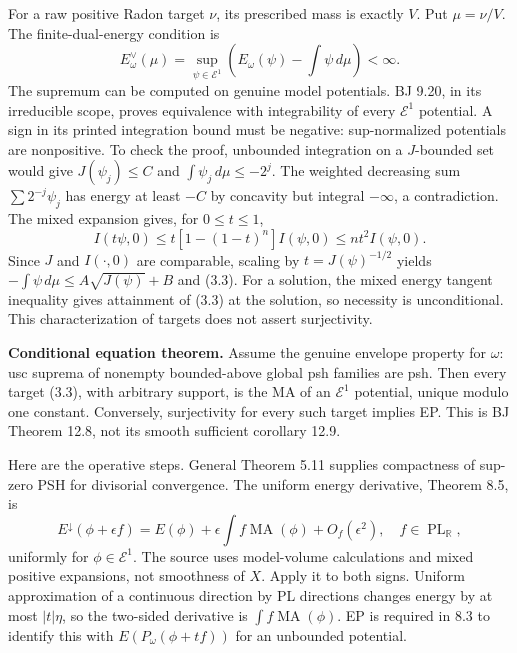 \documentclass[
  10pt,
]{article}
\begin{document}
For a raw positive Radon target \(\nu\), its prescribed mass is exactly
\(V\). Put \(\mu=\nu/V\). The finite-dual-energy condition is
\[E_\omega^\vee(\mu)=\sup_{\psi\in\mathcal E^1}
       \left(E_\omega(\psi)-\int\psi\,d\mu\right)<\infty.\tag{3.3}\] The
supremum can be computed on genuine model potentials. BJ 9.20, in its
irreducible scope, proves equivalence with integrability of every
\(\mathcal E^1\) potential. A sign in its printed integration bound must
be negative: sup-normalized potentials are nonpositive. To check the
proof, unbounded integration on a \(J\)-bounded set would give
\(J(\psi_j)\le C\) and \(\int\psi_j\,d\mu\le-2^j\). The weighted
decreasing sum \(\sum2^{-j}\psi_j\) has energy at least \(-C\) by
concavity but integral \(-\infty\), a contradiction. The mixed expansion
gives, for \(0\le t\le1\),
\[I(t\psi,0)\le t[1-(1-t)^n]I(\psi,0)\le nt^2 I(\psi,0).\] Since \(J\)
and \(I(\cdot,0)\) are comparable, scaling by \(t=J(\psi)^{-1/2}\)
yields \(-\int\psi\,d\mu\le A\sqrt{J(\psi)}+B\) and (3.3). For a
solution, the mixed energy tangent inequality gives attainment of (3.3)
at the solution, so necessity is unconditional. This characterization of
targets does not assert surjectivity.

\textbf{Conditional equation theorem.} Assume the genuine envelope
property for \(\omega\): usc suprema of nonempty bounded-above global
psh families are psh. Then every target (3.3), with arbitrary support,
is the MA of an \(\mathcal E^1\) potential, unique modulo one constant.
Conversely, surjectivity for every such target implies EP. This is BJ
Theorem 12.8, not its smooth sufficient corollary 12.9.

Here are the operative steps. General Theorem 5.11 supplies compactness
of sup-zero PSH for divisorial convergence. The uniform energy
derivative, Theorem 8.5, is \[E^\downarrow(\phi+\epsilon f)
 =E(\phi)+\epsilon\int f\operatorname{MA}(\phi)+O_f(\epsilon^2),\quad f\in\operatorname{PL}_{\mathbb R},\]
uniformly for \(\phi\in\mathcal E^1\). The source uses model-volume
calculations and mixed positive expansions, not smoothness of \(X\).
Apply it to both signs. Uniform approximation of a continuous direction
by PL directions changes energy by at most \(|t|\eta\), so the two-sided
derivative is \(\int f\operatorname{MA}(\phi)\). EP is required in 8.3
to identify this with \(E(P_\omega(\phi+tf))\) for an unbounded
potential.
\end{document}
